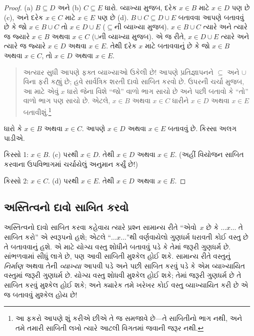 \documentclass[../../../include/open-logic-section]{subfiles}
\begin{document}
\begin{proof}
  (a) $B \subseteq D$ અને (b) $C \subseteq E$ ધારો. વ્યાખ્યા
  મુજબ, દરેક $x \in B$ માટે $x \in D$ પણ છે (c), અને દરેક
  $x \in C$ માટે $x \in E$ પણ છે (d). $B \cup C \subseteq D \cup E$ બતાવવા
  આપણે બતાવવું છે કે જો $x \in B \cup C$ તો $x \in D \cup E$
  ($\subseteq$ની વ્યાખ્યા મુજબ). $x \in B \cup C$ ત્યારે
  અને ત્યારે જ જ્યારે $x \in B$ અથવા $x \in
  C$ ($\cup$ની વ્યાખ્યા મુજબ). એ જ રીતે, $x \in D \cup E$
  ત્યારે અને ત્યારે જ જ્યારે $x \in D$ અથવા $x \in E$.
  તેથી દરેક $x$ માટે બતાવવાનું છે કે જો $x \in B$ અથવા
  $x \in C$, તો $x \in D$ અથવા $x \in E$.

  \begin{quote}
  અત્યાર સુધી આપણે ફક્ત વ્યાખ્યાઓ ઉકેલી છે!{} આપણે
  પ્રતિજ્ઞાપનને $\subseteq$ અને $\cup$ વિના ફરી કહ્યું છે;
  હવે સાર્વત્રિક શરતી દાવો સાબિત કરવો છે. ઉપરની ચર્ચા મુજબ,
  આ માટે એવું $x$ ધારો જેના વિશે ``જો'' વાળો ભાગ સાચો છે
  અને પછી બતાવો કે ``તો'' વાળો ભાગ પણ સાચો છે. એટલે,
  $x
  \in B$ અથવા $x \in C$ ધારીને $x \in D$ અથવા $x \in
  E$ બતાવીશું.\footnote{આ ફકરો આપણે શું કરીએ છીએ તે જ સમજાવે
    છે---તે સાબિતીનો ભાગ નથી, અને તમે તમારી સાબિતી લખો ત્યારે
    આટલી વિગતમાં જવાની જરૂર નથી.}
  \end{quote}

  ધારો કે $x \in B$ અથવા $x \in C$. આપણે $x \in D$
  અથવા $x \in E$ બતાવવું છે. કિસ્સા અલગ પાડીએ.

  કિસ્સો 1: $x \in B$. (c) પરથી $x \in D$. તેથી $x \in D$ અથવા
  $x \in
  E$. (અહીં વિયોજન સાબિત કરવાના ઉપવિભાગમાં ચર્ચાયેલું અનુમાન કર્યું છે!)

  કિસ્સો 2: $x \in C$. (d) પરથી $x \in E$. તેથી $x \in D$ અથવા $x \in E$.
 \end{proof}

\subsection{અસ્તિત્વનો દાવો સાબિત કરવો}

અસ્તિત્વનો દાવો સાબિત કરવા કહેવાય ત્યારે પ્રશ્ન સામાન્ય રીતે
``એવો~$x$ છે કે $\dots x \dots$ તે સાબિત કરો'' એ સ્વરૂપનો
હશે; એટલે ``$\dots x
\dots$''થી વર્ણવાયેલો ગુણધર્મ ધરાવતી કોઈ વસ્તુ છે તે બતાવવાનું
હશે. એ માટે યોગ્ય વસ્તુ શોધીને બતાવવું પડે કે તેમાં જરૂરી
ગુણધર્મ છે. સાંભળવામાં સીધું લાગે છે, પણ આવી સાબિતી મુશ્કેલ
હોઈ શકે. સામાન્ય રીતે વસ્તુનું \emph{નિર્માણ} અથવા તેની
\emph{વ્યાખ્યા} આપવી પડે અને પછી સાબિત કરવું પડે કે એમ
વ્યાખ્યાયિત વસ્તુમાં જરૂરી ગુણધર્મ છે. યોગ્ય વસ્તુ શોધવી
મુશ્કેલ હોઈ શકે; તેમાં જરૂરી ગુણધર્મ છે તે સાબિત કરવું મુશ્કેલ
હોઈ શકે; અને ક્યારેક તમે ખરેખર કોઈ વસ્તુ વ્યાખ્યાયિત કરી છે
એ જ બતાવવું મુશ્કેલ હોય છે!{}
\end{document}
